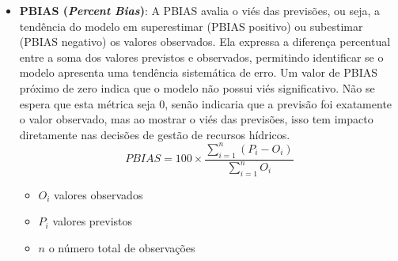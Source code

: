 \begin{itemize}
	
	\item \textbf{PBIAS (\textit{Percent Bias})}: A PBIAS avalia o viés das previsões, ou seja, a tendência do modelo em superestimar (PBIAS positivo) ou subestimar (PBIAS negativo) os valores observados. Ela expressa a diferença percentual entre a soma dos valores previstos e observados, permitindo identificar se o modelo apresenta uma tendência sistemática de erro. Um valor de PBIAS próximo de zero indica que o modelo não possui viés significativo. Não se espera que esta métrica seja 0, senão indicaria que a previsão foi exatamente o valor observado, mas ao mostrar o viés das previsões, isso tem impacto diretamente nas decisões de gestão de recursos hídricos.\cite{rayyan-33388455}
	\begin{equation}
		PBIAS = 100 \times \frac{\sum_{i=1}^{n} (P_i - O_i)}{\sum_{i=1}^{n} O_i}
	\end{equation}
	\begin{itemize}
		\item $O_i$ valores observados
		\item $P_i$ valores previstos
		\item $n$ o número total de observações
	\end{itemize}
	

\end{itemize}
